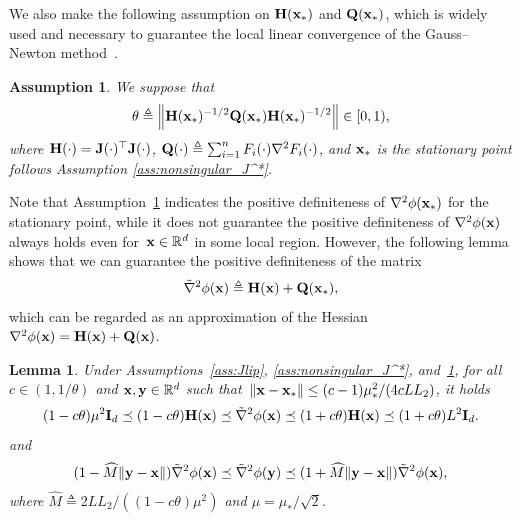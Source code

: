 \documentclass[11pt]{article}
\theoremstyle{plain}
\newtheorem{lemma}[theorem]{Lemma}
\newtheorem{assumption}[theorem]{Assumption}
\theoremstyle{definition}
\theoremstyle{remark}
\theoremstyle{plain}
\newcommand{\Norm}[1]{\left\| #1 \right\|}
\def\vx{{\bf{x}}}
\def\vy{{\bf{y}}}
\def\BR{{\mathbb{R}}}
\def\mH {{\bf H}}
\def\mJ {{\bf J}}
\def\vx {{{\bf x}}}
\def\vy {{{\bf y}}}
\def\BR{{\mathbb{R}}}
\def\H{{\bf H}}
\def\I{{\bf I}}
\def\Q{{\bf Q}}
\def\x{{\bf x}}
\def\y{{\bf y}}
\begin{document}
We also make the following assumption on $\H(\x_*)$ and $\Q(\x_*)$, which is widely used and necessary to guarantee the local linear convergence of the Gauss--Newton method~\citep{gratton2007approximate,ortega2000iterative,wedin1974gauss}.
\begin{assumption}
\label{ass:deltacondi}
We suppose that
\begin{align}
\label{eq:condiDelta}
\theta\triangleq\Norm{\H(\x_*)^{-1/2}\Q(\x_*)\H(\x_*)^{-1/2}}\in[0,1),
\end{align}
where $\mH(\cdot)=\mJ(\cdot)^\top\mJ(\cdot)$, $\Q(\cdot)\triangleq \sum_{i=1}^n F_i(\cdot)\nabla^2 F_i(\cdot)$, and $\vx_*$ is the stationary point follows Assumption \ref{ass:nonsingular_J^*}.
\end{assumption}
Note that Assumption~\ref{ass:deltacondi} indicates the positive definiteness of $\nabla^2\phi(\x_*)$ for the stationary point, while it does not guarantee the positive definiteness of $\nabla^2\phi(\x)$ always holds even for~$\vx\in\BR^d$ in some local region.
However, the following lemma shows that we can guarantee the positive definiteness of the matrix
\begin{align*}
    \tilde{\nabla}^2\phi(\x)\triangleq \H(\x) + \Q(\x_*),
\end{align*}
which can be regarded as an approximation of the Hessian $\nabla^2\phi(\x) =\H(\x) + \Q(\x)$.
\begin{lemma}
\label{lm:pd_approximate_phi}
Under Assumptions~\ref{ass:Jlip}, \ref{ass:nonsingular_J^*}, and~\ref{ass:deltacondi}, 
for all $c\in(1,1/\theta)$ and $\x,\vy\in\BR^d$ such that~$\|\x-\x_*\|\leq(c-1)\mu_*^2/(4cLL_2)$, it holds
\begin{align}\label{eq:approx_phi_positive}
     (1-c\theta)\mu^2 \I_d \preceq (1-c\theta)\H(\x)\preceq  \tilde{\nabla}^2\phi(\x)\preceq (1+c\theta)\H(\x)\preceq (1+c\theta)L^2\I_d.
\end{align}
and
\begin{align}\label{eq:concor_phi}
    (1-\widehat M\|\y-\x\|)\tilde{\nabla}^2\phi(\x)
        \preceq\tilde{\nabla}^2\phi(\y)
        \preceq(1+\widehat M\|\y-\x\|)\tilde{\nabla}^2\phi(\x),
\end{align}
where $\widehat M\triangleq 2LL_2/((1-c\theta)\mu^2)$ and $\mu=\mu_*/\sqrt{2}$. 
\end{lemma}
\end{document}
